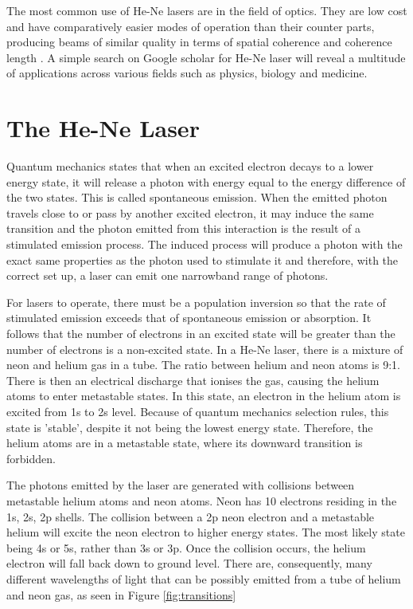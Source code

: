 \documentclass[aps,prl,reprint,10pt,amsmath,amssymb,superscriptaddress,a4paper]{revtex4-2}
\begin{document}
The most common use of He-Ne lasers are in the field of optics. They are low cost and have comparatively easier modes of operation than their counter parts, producing beams of similar 
quality in terms of spatial coherence and coherence length \citep{HeliumNeonLaser_Wikipedia_2025}. A simple search on Google scholar for He-Ne laser will reveal a multitude of applications 
across various fields such as physics, biology and medicine.

\section{The He-Ne Laser}

Quantum mechanics states that when an excited electron decays to a lower energy state, it will release a photon with energy equal to the energy difference of the two states. This is called 
spontaneous emission. When the emitted photon travels close to or pass by another excited electron, it may induce the same transition and the photon emitted from this interaction is the result 
of a stimulated emission process. The induced process will produce a photon with the exact same properties as the photon used to stimulate it and therefore, with the correct set up, a laser can 
emit one narrowband range of photons.

For lasers to operate, there must be a population inversion so that the rate of stimulated emission exceeds that of spontaneous emission or absorption. It follows 
that the number of electrons in an excited state will be greater than the number of electrons is a non-excited state. In a He-Ne laser, there is a mixture of neon and helium gas in a tube. The ratio between 
helium and neon atoms is 9:1. There is then an electrical discharge that ionises the gas, causing the helium atoms to enter metastable states. In this state, an electron in the helium atom is excited from 1s 
to 2s level. Because of quantum mechanics selection rules, this state is 'stable', despite it not being the lowest energy state. Therefore, the helium atoms are in a metastable state, where its downward transition 
is forbidden. 

The photons emitted by the laser are generated with collisions between metastable helium atoms and neon atoms. Neon has 10 electrons residing in the 1s, 2s, 2p shells. The collision between a 2p neon electron and a 
metastable helium will excite the neon electron to higher energy states. The most likely state being 4s or 5s, rather than 3s or 3p. Once the collision occurs, the helium electron will fall back down to ground level.
There are, consequently, many different wavelengths of light that can be possibly emitted from a tube of helium and neon gas, as seen in Figure \ref{fig:transitions}
\end{document}
